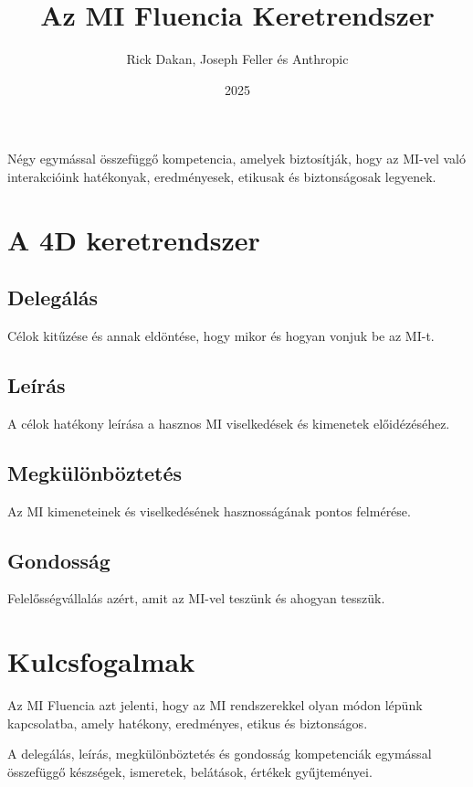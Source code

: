 \documentclass[a4paper, 11pt]{article}
\makeatletter
\renewcommand{\maketitle}{
  \begin{center}
    {\fontsize{22}{26}\bfseries\color{primary}\@title}
    \vspace{0.5em}
    {\color{lightgray}\titlerule[3pt]}
    \vspace{1.5em}
  \end{center}
}
\newenvironment{customquote}
  {\begin{tcolorbox}[
    left=4mm,
    right=4mm,
    top=4mm,
    bottom=4mm,
    colback=lightgray,
    colframe=accent,
    leftrule=4mm,
    rightrule=0mm,
    toprule=0mm,
    bottomrule=0mm,
    arc=2mm,
    outer arc=2mm
  ]}
  {\end{tcolorbox}}
\makeatother
\begin{document}
\title{Az MI Fluencia Keretrendszer}
\author{Rick Dakan, Joseph Feller és Anthropic}
\date{2025}
\maketitle


\begin{customquote}
Négy egymással összefüggő kompetencia, amelyek biztosítják, hogy az MI-vel való interakcióink hatékonyak, eredményesek, etikusak és biztonságosak legyenek.
\end{customquote}

\section{A 4D keretrendszer}

\subsection{Delegálás}
Célok kitűzése és annak eldöntése, hogy mikor és hogyan vonjuk be az MI-t.

\subsection{Leírás}
A célok hatékony leírása a hasznos MI viselkedések és kimenetek előidézéséhez.

\subsection{Megkülönböztetés}
Az MI kimeneteinek és viselkedésének hasznosságának pontos felmérése.

\subsection{Gondosság}
Felelősségvállalás azért, amit az MI-vel teszünk és ahogyan tesszük.

\section{Kulcsfogalmak}

\begin{customquote}
Az MI Fluencia azt jelenti, hogy az MI rendszerekkel olyan módon lépünk kapcsolatba, amely hatékony, eredményes, etikus és biztonságos.

A delegálás, leírás, megkülönböztetés és gondosság kompetenciák egymással összefüggő készségek, ismeretek, belátások, értékek gyűjteményei.
\end{customquote}
\end{document}
